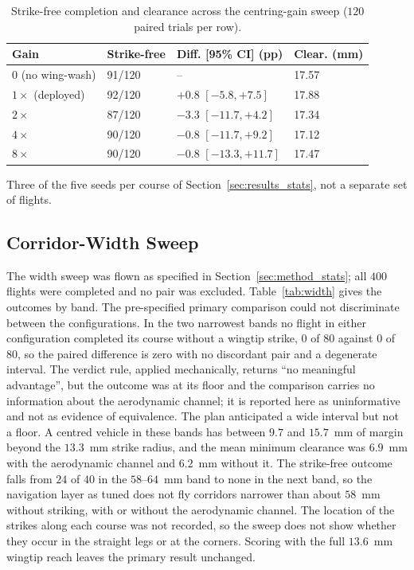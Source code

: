 \documentclass[final,5p,times]{elsarticle}
\begin{document}
\begin{table}[t]
\centering
\begin{threeparttable}
\caption{Strike-free completion and clearance across the centring-gain sweep ($120$ paired trials per row).}
\label{tab:gain}
\footnotesize\setlength{\tabcolsep}{3pt}
\begin{tabular*}{\columnwidth}{@{\extracolsep{\fill}}llll@{}}
\toprule
Gain & Strike-free & Diff. [95\% CI] (pp) & Clear. (mm) \\
\midrule
$0$ (no wing-wash)\tnote{a} & 91/120 & -- & 17.57 \\
$1\times$ (deployed)\tnote{a} & 92/120 & $+0.8$ $[-5.8, +7.5]$ & 17.88 \\
$2\times$ & 87/120 & $-3.3$ $[-11.7, +4.2]$ & 17.34 \\
$4\times$ & 90/120 & $-0.8$ $[-11.7, +9.2]$ & 17.12 \\
$8\times$ & 90/120 & $-0.8$ $[-13.3, +11.7]$ & 17.47 \\
\bottomrule
\end{tabular*}
\begin{tablenotes}\footnotesize
\item[a] Three of the five seeds per course of Section~\ref{sec:results_stats}, not a separate set of flights.
\end{tablenotes}
\end{threeparttable}
\end{table}

\subsection{Corridor-Width Sweep}
\label{sec:results_width}

The width sweep was flown as specified in Section~\ref{sec:method_stats}; all $400$ flights were completed and no pair was excluded. Table~\ref{tab:width} gives the outcomes by band. The pre-specified primary comparison could not discriminate between the configurations. In the two narrowest bands no flight in either configuration completed its course without a wingtip strike, $0$ of $80$ against $0$ of $80$, so the paired difference is zero with no discordant pair and a degenerate interval. The verdict rule, applied mechanically, returns ``no meaningful advantage'', but the outcome was at its floor and the comparison carries no information about the aerodynamic channel; it is reported here as uninformative and not as evidence of equivalence. The plan anticipated a wide interval but not a floor. A centred vehicle in these bands has between $9.7$ and $15.7$~mm of margin beyond the $13.3$~mm strike radius, and the mean minimum clearance was $6.9$~mm with the aerodynamic channel and $6.2$~mm without it. The strike-free outcome falls from $24$ of $40$ in the $58$--$64$~mm band to none in the next band, so the navigation layer as tuned does not fly corridors narrower than about $58$~mm without striking, with or without the aerodynamic channel. The location of the strikes along each course was not recorded, so the sweep does not show whether they occur in the straight legs or at the corners. Scoring with the full $13.6$~mm wingtip reach leaves the primary result unchanged.
\end{document}
